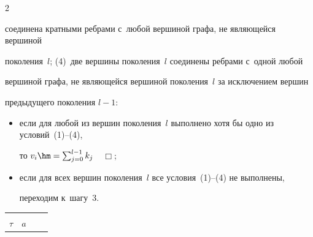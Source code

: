 \begin{multicols}{2}
\begin{enumerate}
соединена кратными ребрами с~любой вершиной графа, не являющейся вершиной 


поколения~$l$; (4)~две вершины поколения~$l$ соединены ребрами с~одной любой 


вершиной графа, не являющейся вершиной поколения~$l$ за исключением вершин 


предыдущего поколения $l-1$:


\begin{itemize}


\item если для любой из вершин поколения~$l$ выполнено хотя бы одно из условий~(1)--(4), 


то $v_i\hm=\sum_{j=0}^{l-1}k_j$~~$\Box$;\\[-13.5pt]


\item если для всех вершин поколения~$l$ все условия~(1)--(4) не выполнены, 


переходим к~шагу~3.


\end{itemize}


\end{enumerate}





\begin{table}[b]\small %


\vspace*{-12pt}


\begin{minipage}[t]{80mm}


\begin{center}


\parbox{50mm}{


}





\vspace*{2ex}








\begin{tabular}{|l|r|r|r|}


\hline


&&&\\[-9pt]


\multicolumn{1}{|c|}{$\tau$} & \multicolumn{1}{c|}{$a$} & 



\end{tabular}
\end{center}
\end{minipage}
\end{table}
\end{multicols}
